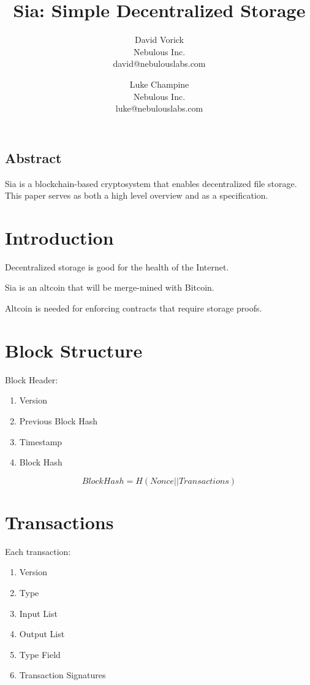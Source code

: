 \documentclass[twocolumn]{article}
\begin{document}
\frenchspacing

\title{Sia: Simple Decentralized Storage}

\author{
{\rm David Vorick}\\
Nebulous Inc.\\
david@nebulouslabs.com
\and
{\rm Luke Champine}\\
Nebulous Inc.\\
luke@nebulouslabs.com
}

\maketitle

\subsection*{Abstract}
Sia is a blockchain-based cryptosystem that enables decentralized file storage.
This paper serves as both a high level overview and as a specification.

\section{Introduction}
Decentralized storage is good for the health of the Internet.

Sia is an altcoin that will be merge-mined with Bitcoin.

Altcoin is needed for enforcing contracts that require storage proofs.

\section{Block Structure}
Block Header:
\begin{enumerate}
	\item Version
	\item Previous Block Hash
	\item Timestamp
	\item Block Hash
\end{enumerate}

\[
Block Hash = H(Nonce || Transactions)
\]

\section{Transactions}
Each transaction:
\begin{enumerate}
	\item Version
	\item Type
	\item Input List
	\item Output List
	\item Type Field
	\item Transaction Signatures
\end{enumerate}
\end{document}
